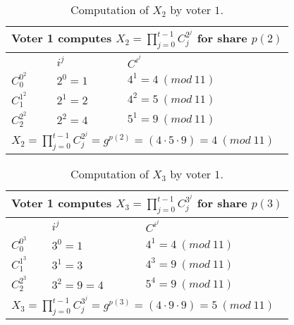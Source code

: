 \begin{table}[H]
\centering
\begin{tabular}{|l|l|l|}
\hline
\multicolumn{3}{|l|}{\textbf{Voter 1 computes $X_2 =\prod\limits_{j=0}^{t-1} C_j^{2^j}$  for share $p(2)$ }}          \\ \hline
                                                         & $i^j$              & $C^{i^{j}}$          \\ \hline
$C^{0^{2}}_0$           & $2^{0} = 1$          & $4^{1} = 4 \ (mod \ 11)$                   \\ \hline
$C^{1^{2}}_1$           & $2^{1} = 2$          & $4^{2} = 5 \ (mod \ 11)$                   \\ \hline
$C^{2^{2}}_2$           & $2^{2} = 4$          & $5^{1} = 9 \ (mod \ 11)$                   \\ \hline
\multicolumn{3}{|l|}{$X_2 =\prod\limits_{j=0}^{t-1} C_j^{2^j} = g^{p(2)} = (4 \cdot 5 \cdot 9) = 4 \ (mod \ 11)$} \\ \hline
\end{tabular}
\caption{Computation of $X_2$ by voter $1$. }
\label{my-label}
\end{table}

\begin{table}[H]
\centering
\begin{tabular}{|l|l|l|}
\hline
\multicolumn{3}{|l|}{\textbf{Voter 1 computes $X_3 =\prod\limits_{j=0}^{t-1} C_j^{3^j}$  for share $p(3)$ }}          \\ \hline
                                                         & $i^j$              & $C^{i^{j}}$          \\ \hline
$C^{0^{3}}_0$           & $3^{0} = 1$          & $4^{1} = 4 \ (mod \ 11)$                   \\ \hline
$C^{1^{3}}_1$           & $3^{1} = 3$          & $4^{3} = 9 \ (mod \ 11)$                   \\ \hline
$C^{2^{3}}_2$           & $3^{2} = 9 = 4$          & $5^{4} = 9 \ (mod \ 11)$                   \\ \hline
\multicolumn{3}{|l|}{$X_3 =\prod\limits_{j=0}^{t-1} C_j^{3^j} = g^{p(3)} = (4 \cdot 9 \cdot 9) = 5 \ (mod \ 11)$} \\ \hline
\end{tabular}
\caption{Computation of $X_3$ by voter $1$. }
\label{my-label}
\end{table}


